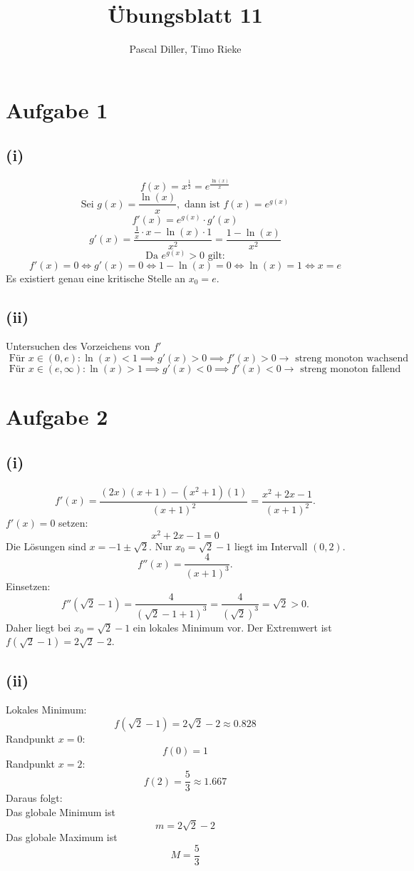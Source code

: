 \documentclass{article}
\title{Übungsblatt 11}
\author{Pascal Diller, Timo Rieke}
\begin{document}
\maketitle

\section*{Aufgabe 1}
\subsection*{(i)}
\[f(x) = x^{\frac{1}{2}} = e^{\frac{\ln(x)}{x}}\]
\[\text{Sei } g(x) = \frac{\ln(x)}{x}, \text{ dann ist } f(x) = e^{g(x)}\]
\[f'(x) = e^{g(x)} \cdot g'(x)\]
\[g'(x) = \frac{\frac{1}{x} \cdot x - \ln(x) \cdot 1}{x^2} = \frac{1 - \ln(x)}{x^2}\]
\[\text{Da } e^{g(x)} > 0 \text{ gilt:} \]
\[f'(x) = 0 \Leftrightarrow g'(x) = 0 \Leftrightarrow 1 - \ln(x) = 0 \Leftrightarrow \ln(x) = 1 \Leftrightarrow x = e\]
\[\]
Es existiert genau eine kritische Stelle an $x_0 = e$.

\subsection*{(ii)}
Untersuchen des Vorzeichens von $f'$
\[\text{ Für } x \in (0, e): \ln(x) < 1 \implies g'(x) > 0 \implies f'(x) > 0 \to \text{ streng monoton wachsend}\]
\[\text{ Für } x \in (e, \infty): \ln(x) > 1 \implies g'(x) < 0 \implies f'(x) < 0 \to \text{ streng monoton fallend}\]

\section*{Aufgabe 2}
\subsection*{(i)}
\[f'(x) = \frac{(2x)(x+1) - (x^2+1)(1)}{(x+1)^2} = \frac{x^2+2x-1}{(x+1)^2}.\]
\(f'(x) = 0\) setzen:
\[x^2+2x-1 = 0\]
Die Lösungen sind \(x = -1 \pm \sqrt{2}\). Nur \(x_0 = \sqrt{2}-1\) liegt im Intervall \((0, 2)\).
\[f''(x) = \frac{4}{(x+1)^3}.\]
Einsetzen:
\[f''(\sqrt{2}-1) = \frac{4}{(\sqrt{2}-1+1)^3} = \frac{4}{(\sqrt{2})^3} = \sqrt{2} > 0.\]
Daher liegt bei \(x_0 = \sqrt{2}-1\) ein lokales Minimum vor. Der Extremwert ist \(f(\sqrt{2}-1) = 2\sqrt{2}-2\).

\subsection*{(ii)}
Lokales Minimum: \[f(\sqrt{2}-1) = 2\sqrt{2}-2 \approx 0.828\]
Randpunkt \(x=0\): \[f(0) = 1\]
Randpunkt \(x=2\): \[f(2) = \frac{5}{3} \approx 1.667\]
Daraus folgt: \\
Das globale Minimum ist \[m = 2\sqrt{2}-2\]
Das globale Maximum ist \[M = \frac{5}{3}\]
\end{document}
